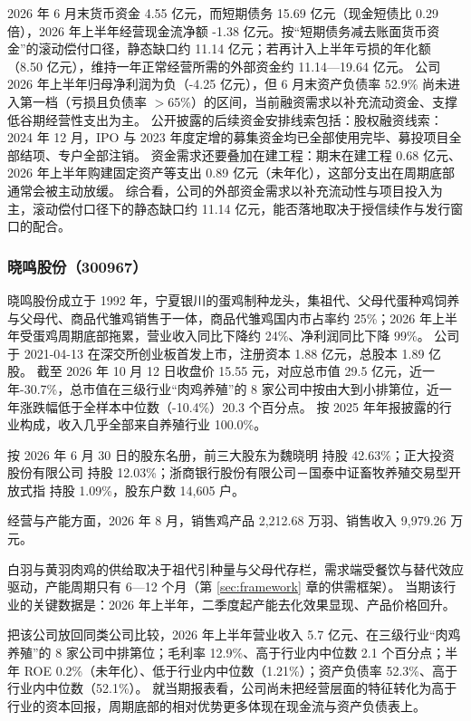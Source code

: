  2026 年 6 月末货币资金 4.55 亿元，而短期债务 15.69 亿元（现金短债比 0.29 倍），2026 年上半年经营现金流净额 -1.38 亿元。按“短期债务减去账面货币资金”的滚动偿付口径，静态缺口约 11.14 亿元；若再计入上半年亏损的年化额（8.50 亿元），维持一年正常经营所需的外部资金约 11.14---19.64 亿元。 公司 2026 年上半年归母净利润为负（-4.25 亿元），但 6 月末资产负债率 52.9\% 尚未进入第一档（亏损且负债率 $>$65\%）的区间，当前融资需求以补充流动资金、支撑低谷期经营性支出为主。 公开披露的后续资金安排线索包括：股权融资线索：2024 年 12 月，IPO 与 2023 年度定增的募集资金均已全部使用完毕、募投项目全部结项、专户全部注销。 资金需求还要叠加在建工程：期末在建工程 0.68 亿元、2026 年上半年购建固定资产等支出 0.89 亿元（未年化），这部分支出在周期底部通常会被主动放缓。 综合看，公司的外部资金需求以补充流动性与项目投入为主，滚动偿付口径下的静态缺口约 11.14 亿元，能否落地取决于授信续作与发行窗口的配合。




\subsubsection{晓鸣股份（300967）}
\label{co:300967}

 晓鸣股份成立于 1992 年，宁夏银川的蛋鸡制种龙头，集祖代、父母代蛋种鸡饲养与父母代、商品代雏鸡销售于一体，商品代雏鸡国内市占率约 25\%；2026 年上半年受蛋鸡周期底部拖累，营业收入同比下降约 24\%、净利润同比下降 99\%。 公司于 2021-04-13 在深交所创业板首发上市，注册资本 1.88 亿元，总股本 1.89 亿股。 截至 2026 年 10 月 12 日收盘价 15.55 元，对应总市值 29.5 亿元，近一年-30.7\%，总市值在三级行业“肉鸡养殖”的 8 家公司中按由大到小排第位，近一年涨跌幅低于全样本中位数（-10.4\%）20.3 个百分点。 按 2025 年年报披露的行业构成，收入几乎全部来自养殖行业 100.0\%。

 按 2026 年 6 月 30 日的股东名册，前三大股东为魏晓明 持股 42.63\%；正大投资股份有限公司 持股 12.03\%；浙商银行股份有限公司－国泰中证畜牧养殖交易型开放式指 持股 1.09\%，股东户数 14,605 户。

 经营与产能方面，2026 年 8 月，销售鸡产品 2,212.68 万羽、销售收入 9,979.26 万元。

 白羽与黄羽肉鸡的供给取决于祖代引种量与父母代存栏，需求端受餐饮与替代效应驱动，产能周期只有 6---12 个月（第 \ref{sec:framework} 章的供需框架）。 当期该行业的关键数据是：2026 年上半年，二季度起产能去化效果显现、产品价格回升。

 把该公司放回同类公司比较，2026 年上半年营业收入 5.7 亿元、在三级行业“肉鸡养殖”的 8 家公司中排第位；毛利率 12.9\%、高于行业内中位数 2.1 个百分点；半年 ROE 0.2\%（未年化）、低于行业内中位数（1.21\%）；资产负债率 52.3\%、高于行业内中位数（52.1\%）。 就当期报表看，公司尚未把经营层面的特征转化为高于行业的资本回报，周期底部的相对优势更多体现在现金流与资产负债表上。

